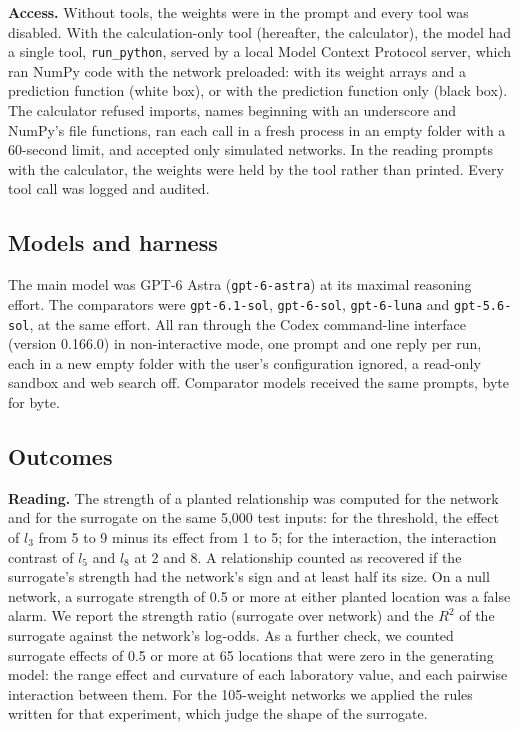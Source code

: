 \documentclass[11pt]{article}
\newcommand{\astra}{GPT-6 Astra}
\begin{document}
\textbf{Access.} Without tools, the weights were in the prompt and every tool was disabled. With the calculation-only tool (hereafter, the calculator), the model had a single tool, \texttt{run\_python}, served by a local Model Context Protocol server, which ran NumPy code with the network preloaded: with its weight arrays and a prediction function (white box), or with the prediction function only (black box). The calculator refused imports, names beginning with an underscore and NumPy's file functions, ran each call in a fresh process in an empty folder with a 60-second limit, and accepted only simulated networks. In the reading prompts with the calculator, the weights were held by the tool rather than printed. Every tool call was logged and audited.

\subsection{Models and harness}

The main model was \astra{} (\texttt{gpt-6-astra}) at its maximal reasoning effort. The comparators were \texttt{gpt-6.1-sol}, \texttt{gpt-6-sol}, \texttt{gpt-6-luna} and \texttt{gpt-5.6-sol}, at the same effort. All ran through the Codex command-line interface (version 0.166.0) in non-interactive mode, one prompt and one reply per run, each in a new empty folder with the user's configuration ignored, a read-only sandbox and web search off. Comparator models received the same prompts, byte for byte.

\subsection{Outcomes}

\textbf{Reading.} The strength of a planted relationship was computed for the network and for the surrogate on the same 5,000 test inputs: for the threshold, the effect of $l_3$ from 5 to 9 minus its effect from 1 to 5; for the interaction, the interaction contrast of $l_5$ and $l_8$ at 2 and 8. A relationship counted as recovered if the surrogate's strength had the network's sign and at least half its size. On a null network, a surrogate strength of 0.5 or more at either planted location was a false alarm. We report the strength ratio (surrogate over network) and the $R^2$ of the surrogate against the network's log-odds. As a further check, we counted surrogate effects of 0.5 or more at 65 locations that were zero in the generating model: the range effect and curvature of each laboratory value, and each pairwise interaction between them. For the 105-weight networks we applied the rules written for that experiment, which judge the shape of the surrogate.
\end{document}
